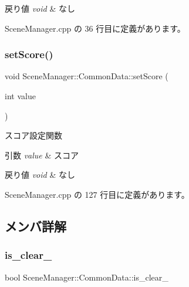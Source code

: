 \begin{DoxyRetVals}{戻り値}
{\em void} & なし \\
\hline
\end{DoxyRetVals}


 Scene\+Manager.\+cpp の 36 行目に定義があります。

\mbox{\label{class_scene_manager_1_1_common_data_a8c30ea362a57f01cdbd667a2224b8af3}} 
\subsubsection{\texorpdfstring{set\+Score()}{setScore()}}
{\footnotesize\ttfamily void Scene\+Manager\+::\+Common\+Data\+::set\+Score (\begin{DoxyParamCaption}\item[{int}]{value }\end{DoxyParamCaption})}



スコア設定関数 


\begin{DoxyParams}{引数}
{\em value} & スコア \\
\hline
\end{DoxyParams}

\begin{DoxyRetVals}{戻り値}
{\em void} & なし \\
\hline
\end{DoxyRetVals}


 Scene\+Manager.\+cpp の 127 行目に定義があります。



\subsection{メンバ詳解}
\mbox{\label{class_scene_manager_1_1_common_data_a467635269880aaf0e5983389cc2ca657}} 
\subsubsection{\texorpdfstring{is\+\_\+clear\+\_\+}{is\_clear\_}}
{\footnotesize\ttfamily bool Scene\+Manager\+::\+Common\+Data\+::is\+\_\+clear\+\_\+\hspace{0.3cm}{\ttfamily [private]}}



